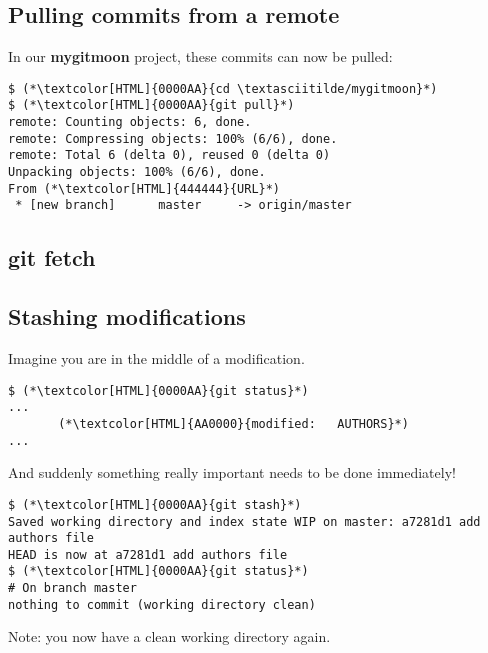 \subsection{Pulling commits from a remote}
\begin{frame}[fragile]
  \subslidetitle
  In our \textbf{mygitmoon} project, these commits can now be pulled:
  \begin{lstlisting}
$ (*\textcolor[HTML]{0000AA}{cd \textasciitilde/mygitmoon}*)
$ (*\textcolor[HTML]{0000AA}{git pull}*)
remote: Counting objects: 6, done.
remote: Compressing objects: 100% (6/6), done.
remote: Total 6 (delta 0), reused 0 (delta 0)
Unpacking objects: 100% (6/6), done.
From (*\textcolor[HTML]{444444}{URL}*)
 * [new branch]      master     -> origin/master
\end{lstlisting}
\end{frame}

\subsection{git fetch}
\begin{frame}[fragile]
  \subslidetitle
\end{frame}

\subsection{Stashing modifications}
\begin{frame}[fragile]
  \subslidetitle

  Imagine you are in the middle of a modification.

  \begin{lstlisting}
$ (*\textcolor[HTML]{0000AA}{git status}*)
...
       (*\textcolor[HTML]{AA0000}{modified:   AUTHORS}*)
...
\end{lstlisting}

  And suddenly something really important needs to be done immediately!

  \begin{lstlisting}
$ (*\textcolor[HTML]{0000AA}{git stash}*)
Saved working directory and index state WIP on master: a7281d1 add authors file
HEAD is now at a7281d1 add authors file
$ (*\textcolor[HTML]{0000AA}{git status}*)
# On branch master
nothing to commit (working directory clean)
\end{lstlisting}
  Note: you now have a clean working directory again.
\end{frame}



